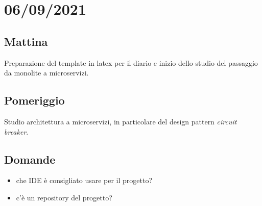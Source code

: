 \section{06/09/2021}
\subsection{Mattina}
Preparazione del template in latex per il diario e inizio dello studio del passaggio da monolite a microservizi.
\subsection{Pomeriggio}
Studio architettura a microservizi, in particolare del design pattern \textit{circuit breaker}.
\subsection{Domande}
\begin{itemize}
    \item che IDE è consigliato usare per il progetto?
    \item c'è un repository del progetto?
\end{itemize} 

